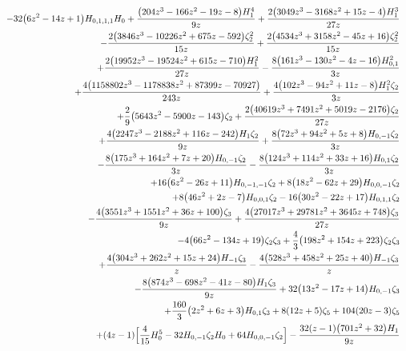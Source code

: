 \begin{eqnarray}
\nonumber \\ &&
-32 \big(6 z^2-14 z+1\big) H_{0,1,1,1}H_0
+\frac{\big(204 z^3-166 z^2-19 z-8\big) H_1^4}{9 z}
+\frac{2 \big(3049  z^3-3168 z^2+15 z-4\big) H_1^3}{27 z}
\nonumber \\ &&
-\frac{2 \big(3846 z^3-10226 z^2+675  z-592\big) \zeta_2^2}{15 z}+\frac{2  \big(4534 z^3+3158 z^2-45  z+16\big) \zeta_2^2}{15 z}
\nonumber \\ &&
+\frac{2 \big(19952 z^3-19524 z^2+615  z-710\big) H_1^2}{27 z}-\frac{8 \big(161 z^3-130 z^2-4 z-16\big)  H_{0,1}^2}{3 z}
\nonumber \\ &&
+\frac{4 \big(1158802 z^3-1178838 z^2+87399 z-70927\big)}{243  z}+\frac{4 \big(102 z^3-94 z^2+11 z-8\big) H_1^2 \zeta_2}{3  z}
\nonumber \\ &&
+\frac{2}{9}  \big(5643 z^2-5900 z-143\big) \zeta_2+\frac{2  \big(40619 z^3+7491 z^2+5019 z-2176\big) \zeta_2}{27 z}
\nonumber \\ &&
+\frac{4  \big(2247 z^3-2188 z^2+116 z-242\big) H_1 \zeta_2}{9 z}+\frac{8 \big(72  z^3+94 z^2+5 z+8\big) H_{0,-1} \zeta_2}{3 z}
\nonumber \\ &&
-\frac{8  \big(175  z^3+164 z^2+7 z+20\big) H_{0,-1} \zeta_2}{3 z}-\frac{8 \big(124 z^3+114  z^2+33 z+16\big) H_{0,1} \zeta_2}{3 z}
\nonumber \\ &&
+16  \big(6 z^2-26z+11\big) H_{0,-1,-1} \zeta_2+8  \big(18 z^2-62 z+29\big)H_{0,0,-1} \zeta_2
\nonumber \\ &&
+8 \big(46 z^2+2 z-7\big) H_{0,0,1} \zeta_2-16\big(30 z^2-22 z+17\big) H_{0,1,1} \zeta_2
\nonumber \\ &&
-\frac{4  \big(3551  z^3+1551 z^2+36 z+100\big) \zeta_3}{9 z}+\frac{4 \big(27017 z^3+29781  z^2+3645 z+748\big) \zeta_3}{27 z}
\nonumber \\ &&
-4  \big(66 z^2-134 z+19\big)\zeta_2 \zeta_3+\frac{4}{3} \big(198 z^2+154 z+223\big) \zeta_2\zeta_3
\nonumber \\ &&
+\frac{4  \big(304 z^3+262 z^2+15 z+24\big) H_{-1}  \zeta_3}{z}-\frac{4 \big(528 z^3+458 z^2+25 z+40\big) H_{-1} \zeta_3}{z}
\nonumber \\ &&
-\frac{8 \big(874 z^3-698 z^2-41 z-80\big) H_1 \zeta_3}{9 z}+32\big(13 z^2-17 z+14\big) H_{0,-1} \zeta_3
\nonumber \\ &&
+\frac{160}{3} \big(2 z^2+6z+3\big) H_{0,1} \zeta_3+8  (12 z+5) \zeta_5+104 (20 z-3)\zeta_5
\nonumber \\ &&
+(4 z-1) \Bigl[\frac{4}{15} H_0^5-32 H_{0,-1} \zeta_2 H_0+64H_{0,0,-1} \zeta_2\Bigr]-\frac{32  (z-1) \big(701 z^2+32\big) H_1}{9  z}

\end{eqnarray}
